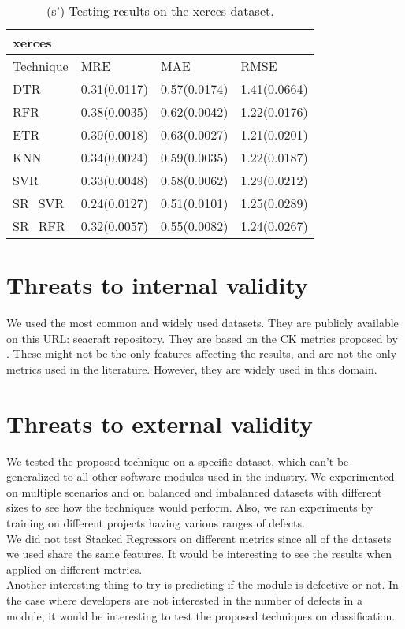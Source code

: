 \documentclass[]{article}
\begin{document}
\begin{table}[h]
	\captionsetup[subtable]{labelformat=empty}
	\begin{adjustwidth}{1.5cm}{}
		\begin{subtable}{9cm}
			\centering
			\caption{(s') Testing results on the xerces dataset.}
			\label{tab:xalan-wv}
			\begin{tabular}{llll}
				\hline
				xerces &              &              &              \\ \hline
				Technique  & MRE          & MAE          & RMSE    \\ \hline
				DTR        & 0.31(0.0117) & 0.57(0.0174) & 1.41(0.0664)  \\
				RFR        & 0.38(0.0035) & 0.62(0.0042) & 1.22(0.0176) \\
				ETR        & 0.39(0.0018) & 0.63(0.0027) & 1.21(0.0201)  \\
				KNN        & 0.34(0.0024) & 0.59(0.0035) & 1.22(0.0187)   \\
				SVR        & 0.33(0.0048) & 0.58(0.0062) & 1.29(0.0212) \\
				SR\_SVR     & 0.24(0.0127) & 0.51(0.0101) & 1.25(0.0289) \\
				SR\_RFR     & 0.32(0.0057) & 0.55(0.0082) & 1.24(0.0267) \\ \hline
			\end{tabular}
		\end{subtable}
	\end{adjustwidth}
\end{table}
\FloatBarrier
\section{Threats to internal validity}
We used the most common and widely used datasets. They are publicly available on this URL: \href{https://zenodo.org/communities/seacraft/search?page=1&size=20&keywords=defect#}{seacraft repository}. They are based on the CK metrics proposed by \cite{chidamber1994metrics}. These might not be the only features affecting the results, and are not the only metrics used in the literature. However, they are widely used in this domain.
\section{Threats to external validity}
We tested the proposed technique on a specific dataset, which can't be generalized to all other software modules used in the industry. We experimented on multiple scenarios and on balanced and imbalanced datasets with different sizes to see how the techniques would perform. Also, we ran experiments by training on different projects having various ranges of defects.\\
We did not test Stacked Regressors on different metrics since all of the datasets we used share the same features. It would be interesting to see the results when applied on different metrics.\\
Another interesting thing to try is predicting if the module is defective or not. In the case where developers are not interested in the number of defects in a module, it would be interesting to test the proposed techniques on classification.
\end{document}
